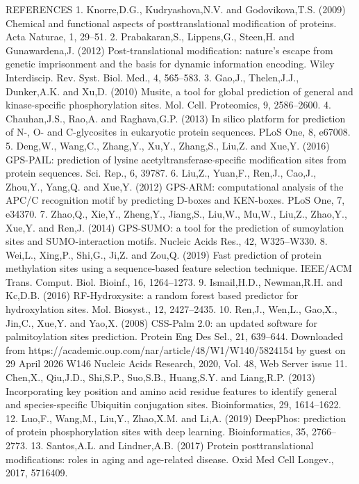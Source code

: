 REFERENCES
1. Knorre,D.G., Kudryashova,N.V. and Godovikova,T.S. (2009)
Chemical and functional aspects of posttranslational modification of
proteins. Acta Naturae, 1, 29–51.
2. Prabakaran,S., Lippens,G., Steen,H. and Gunawardena,J. (2012)
Post-translational modification: nature’s escape from genetic
imprisonment and the basis for dynamic information encoding. Wiley
Interdiscip. Rev. Syst. Biol. Med., 4, 565–583.
3. Gao,J., Thelen,J.J., Dunker,A.K. and Xu,D. (2010) Musite, a tool for
global prediction of general and kinase-specific phosphorylation
sites. Mol. Cell. Proteomics, 9, 2586–2600.
4. Chauhan,J.S., Rao,A. and Raghava,G.P. (2013) In silico platform for
prediction of N-, O- and C-glycosites in eukaryotic protein sequences.
PLoS One, 8, e67008.
5. Deng,W., Wang,C., Zhang,Y., Xu,Y., Zhang,S., Liu,Z. and Xue,Y.
(2016) GPS-PAIL: prediction of lysine acetyltransferase-specific
modification sites from protein sequences. Sci. Rep., 6, 39787.
6. Liu,Z., Yuan,F., Ren,J., Cao,J., Zhou,Y., Yang,Q. and Xue,Y. (2012)
GPS-ARM: computational analysis of the APC/C recognition motif
by predicting D-boxes and KEN-boxes. PLoS One, 7, e34370.
7. Zhao,Q., Xie,Y., Zheng,Y., Jiang,S., Liu,W., Mu,W., Liu,Z., Zhao,Y.,
Xue,Y. and Ren,J. (2014) GPS-SUMO: a tool for the prediction of
sumoylation sites and SUMO-interaction motifs. Nucleic Acids Res.,
42, W325–W330.
8. Wei,L., Xing,P., Shi,G., Ji,Z. and Zou,Q. (2019) Fast prediction of
protein methylation sites using a sequence-based feature selection
technique. IEEE/ACM Trans. Comput. Biol. Bioinf., 16, 1264–1273.
9. Ismail,H.D., Newman,R.H. and Kc,D.B. (2016) RF-Hydroxysite: a
random forest based predictor for hydroxylation sites. Mol. Biosyst.,
12, 2427–2435.
10. Ren,J., Wen,L., Gao,X., Jin,C., Xue,Y. and Yao,X. (2008) CSS-Palm
2.0: an updated software for palmitoylation sites prediction. Protein
Eng Des Sel., 21, 639–644.
Downloaded from https://academic.oup.com/nar/article/48/W1/W140/5824154 by guest on 29 April 2026
W146 Nucleic Acids Research, 2020, Vol. 48, Web Server issue
11. Chen,X., Qiu,J.D., Shi,S.P., Suo,S.B., Huang,S.Y. and Liang,R.P.
(2013) Incorporating key position and amino acid residue features to
identify general and species-specific Ubiquitin conjugation sites.
Bioinformatics, 29, 1614–1622.
12. Luo,F., Wang,M., Liu,Y., Zhao,X.M. and Li,A. (2019) DeepPhos:
prediction of protein phosphorylation sites with deep learning.
Bioinformatics, 35, 2766–2773.
13. Santos,A.L. and Lindner,A.B. (2017) Protein posttranslational
modifications: roles in aging and age-related disease. Oxid Med Cell
Longev., 2017, 5716409.
